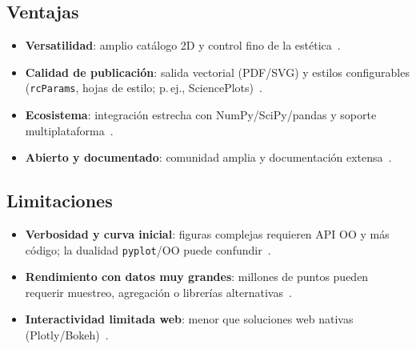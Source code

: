 \subsection{Ventajas}%
\label{subsec:ventajas}
\begin{itemize}
  \item \textbf{Versatilidad}: amplio catálogo 2D y control fino de la estética~\cite{GeeksforGeeksIntroMPL, Vu2023}.
  \item \textbf{Calidad de publicación}: salida vectorial (PDF/SVG) y estilos configurables (\texttt{rcParams}, hojas de estilo; p.\,ej., SciencePlots)~\cite{Hunter2007, MatplotlibDevTeamCustomizing, GarrettSciencePlots}.
  \item \textbf{Ecosistema}: integración estrecha con NumPy/SciPy/pandas y soporte multiplataforma~\cite{VanderPlas2016, Jones2012Matplotlib}.
  \item \textbf{Abierto y documentado}: comunidad amplia y documentación extensa~\cite{MatplotlibDevTeamMain, MatplotlibDevTeamQuickStart}.
\end{itemize}

\subsection{Limitaciones}%
\label{subsec:limitaciones}
\begin{itemize}
  \item \textbf{Verbosidad y curva inicial}: figuras complejas requieren API OO y más código; la dualidad \texttt{pyplot}/OO puede confundir~\cite{Vu2023, RedditBioinfoMatplotlibSucks}.
  \item \textbf{Rendimiento con datos muy grandes}: millones de puntos pueden requerir muestreo, agregación o librerías alternativas~\cite{StackOverflowGnuplotMPL}.
  \item \textbf{Interactividad limitada web}: menor que soluciones web nativas (Plotly/Bokeh)~\cite{GeeksforGeeksIntroMPL}.
\end{itemize}